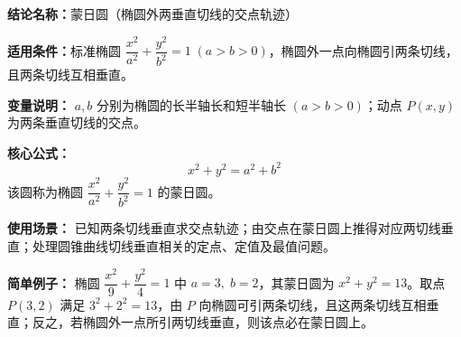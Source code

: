\textbf{结论名称：}蒙日圆（椭圆外两垂直切线的交点轨迹）

\textbf{适用条件：}标准椭圆 \( \dfrac{x^{2}}{a^{2}}+\dfrac{y^{2}}{b^{2}}=1\;(a>b>0) \)，椭圆外一点向椭圆引两条切线，且两条切线互相垂直。

\textbf{变量说明：} \( a,b \) 分别为椭圆的长半轴长和短半轴长 \( (a>b>0) \)；动点 \( P(x,y) \) 为两条垂直切线的交点。

\textbf{核心公式：}
\[
\boxed{x^{2}+y^{2}=a^{2}+b^{2}}
\]
该圆称为椭圆 \( \dfrac{x^{2}}{a^{2}}+\dfrac{y^{2}}{b^{2}}=1 \) 的蒙日圆。

\textbf{使用场景：} 已知两条切线垂直求交点轨迹；由交点在蒙日圆上推得对应两切线垂直；处理圆锥曲线切线垂直相关的定点、定值及最值问题。

\textbf{简单例子：} 椭圆 \( \dfrac{x^{2}}{9}+\dfrac{y^{2}}{4}=1 \) 中 \( a=3,\;b=2 \)，其蒙日圆为 \( x^{2}+y^{2}=13 \)。取点 \( P(3,2) \) 满足 \( 3^{2}+2^{2}=13 \)，由 \( P \) 向椭圆可引两条切线，且这两条切线互相垂直；反之，若椭圆外一点所引两切线垂直，则该点必在蒙日圆上。